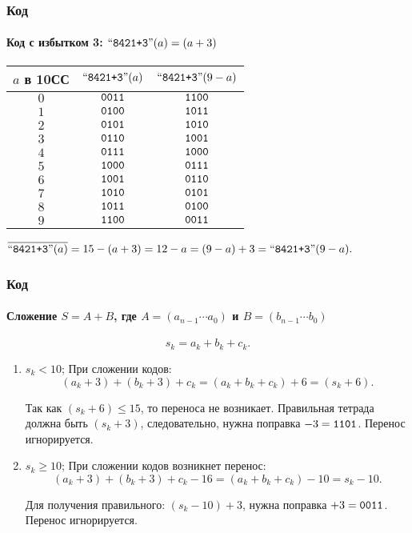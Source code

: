 \begin{frame}
    \frametitle{Код \PlusThreeLabel}
    \framesubtitle{Код с избытком 3: $\text{``\texttt{8421+3}''}(a)=(a+3)$}
    
    \begin{center}
    \begin{tabular}{|c|c|c|}
        \hline\hline
        $a$ в 10СС  & $\text{``\texttt{8421+3}''}(a)$  & $\text{``\texttt{8421+3}''}(9-a)$\\
        \hline\hline
        $0$         & $\texttt{0011}$  & $\texttt{1100}$ \\
        $1$         & $\texttt{0100}$  & $\texttt{1011}$ \\
        $2$         & $\texttt{0101}$  & $\texttt{1010}$ \\
        $3$         & $\texttt{0110}$  & $\texttt{1001}$ \\
        $4$         & $\texttt{0111}$  & $\texttt{1000}$ \\
        $5$         & $\texttt{1000}$  & $\texttt{0111}$ \\
        $6$         & $\texttt{1001}$  & $\texttt{0110}$ \\
        $7$         & $\texttt{1010}$  & $\texttt{0101}$ \\
        $8$         & $\texttt{1011}$  & $\texttt{0100}$ \\
        $9$         & $\texttt{1100}$  & $\texttt{0011}$ \\
        \hline
    \end{tabular}
    \end{center}
    
    $\overline{\text{``\texttt{8421+3}''}(a)}=15-(a+3)=12-a=(9-a)+3=\text{``\texttt{8421+3}''}(9-a).$
\end{frame}

\begin{frame}
    \frametitle{Код \PlusThreeLabel}
    \framesubtitle{Сложение $S=A+B$, где $A=(a_{n-1}\cdots a_0)$ и $B=(b_{n-1}\cdots b_0)$}

    \[
        s_k=a_k+b_k+c_k.
    \]
    
    \begin{enumerate}
        \item $s_k<10$; При сложении кодов: \[(a_k+3)+(b_k+3)+c_k=(a_k+b_k+c_k)+6=(s_k+6).\] 

        Так как $(s_k+6)\leq 15$, то переноса не возникает. Правильная тетрада должна быть $(s_k+3)$, следовательно, нужна поправка $-3=\texttt{1101}$. Перенос игнорируется.
        
        \item $s_k\geq 10$; При сложении кодов возникнет перенос:
        \[(a_k+3)+(b_k+3)+c_k-16=(a_k+b_k+c_k)-10=s_k-10.\] 

        Для получения правильного: $(s_k-10)+3$, нужна поправка $+3=\texttt{0011}$. Перенос игнорируется.
    \end{enumerate}
\end{frame}

